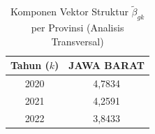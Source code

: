 \begin{table}[H]
\centering
\small
\caption{Komponen Vektor Struktur $\tilde{\beta}_{gk}$ per Provinsi (Analisis Transversal)} \label{tab:sample1beta_provinsi}
\begin{tabular}{|c|c|}
\hline
\textbf{Tahun ($k$)} & \textbf{JAWA BARAT} \\
\hline
2020 & 4,7834 \\
2021 & 4,2591 \\
2022 & 3,8433 \\
\hline
\end{tabular}
\end{table}